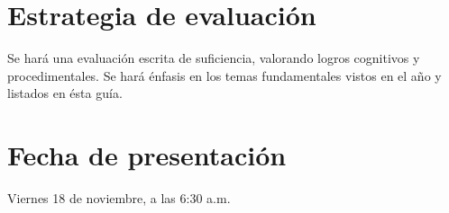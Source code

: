 \documentclass[letterpaper,11pt,twoside]{article}
\begin{document}
\section*{Estrategia de evaluación}
Se hará una evaluación escrita de suficiencia, valorando logros cognitivos y procedimentales. Se hará énfasis en los temas fundamentales vistos en el año y listados en ésta guía.
\section*{Fecha de presentación}
Viernes 18 de noviembre, a las 6:30 a.m.
\end{document}
